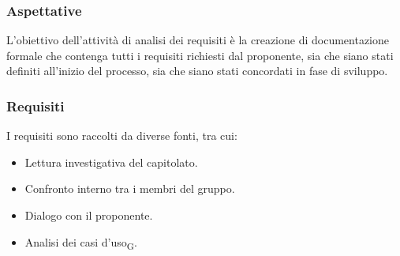\documentclass{article}
\begin{document}
\subsubsection*{Aspettative}
L'obiettivo dell'attività di analisi dei requisiti è la creazione di documentazione formale che contenga tutti i requisiti richiesti dal proponente, sia che siano stati definiti all'inizio del processo, sia che siano stati concordati in fase di sviluppo.
\subsubsection*{Requisiti}
I requisiti sono raccolti da diverse fonti, tra cui:
\begin{itemize}
    \item Lettura investigativa del capitolato.
    \item Confronto interno tra i membri del gruppo.
    \item Dialogo con il proponente.
    \item Analisi dei casi d'uso\textsubscript{G}.
\end{itemize}
\end{document}
